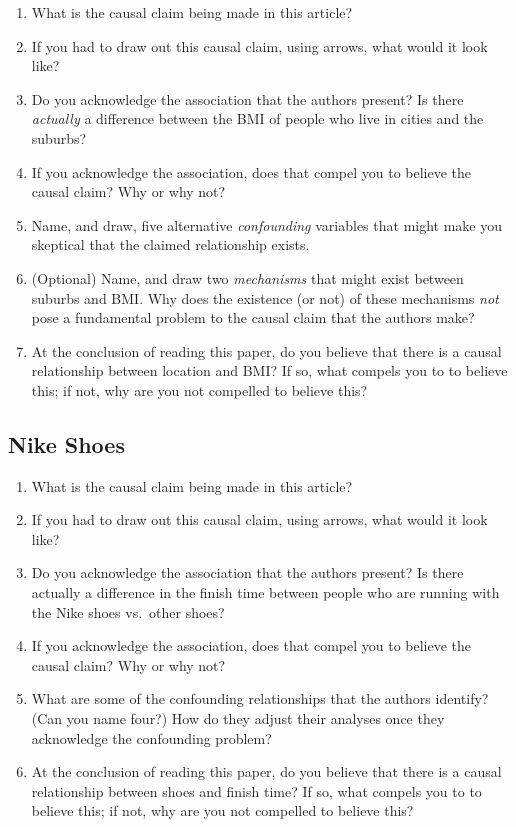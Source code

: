 \documentclass[
]{book}
\providecommand{\tightlist}{%
  \setlength{\itemsep}{0pt}\setlength{\parskip}{0pt}}
\begin{document}
\begin{enumerate}
\def\labelenumi{\arabic{enumi}.}
\tightlist
\item
  What is the causal claim being made in this article?
\item
  If you had to draw out this causal claim, using arrows, what would it
  look like?
\item
  Do you acknowledge the association that the authors present? Is there
  \emph{actually} a difference between the BMI of people who live in
  cities and the suburbs?
\item
  If you acknowledge the association, does that compel you to believe
  the causal claim? Why or why not?
\item
  Name, and draw, five alternative \emph{confounding} variables that
  might make you skeptical that the claimed relationship exists.
\item
  (Optional) Name, and draw two \emph{mechanisms} that might exist
  between suburbs and BMI. Why does the existence (or not) of these
  mechanisms \emph{not} pose a fundamental problem to the causal claim
  that the authors make?
\item
  At the conclusion of reading this paper, do you believe that there is
  a causal relationship between location and BMI? If so, what compels
  you to to believe this; if not, why are you not compelled to believe
  this?
\end{enumerate}

\hypertarget{nike-shoes}{%
\subsection{Nike Shoes}\label{nike-shoes}}

\begin{enumerate}
\def\labelenumi{\arabic{enumi}.}
\tightlist
\item
  What is the causal claim being made in this article?
\item
  If you had to draw out this causal claim, using arrows, what would it
  look like?
\item
  Do you acknowledge the association that the authors present? Is there
  actually a difference in the finish time between people who are
  running with the Nike shoes vs.~other shoes?
\item
  If you acknowledge the association, does that compel you to believe
  the causal claim? Why or why not?
\item
  What are some of the confounding relationships that the authors
  identify? (Can you name four?) How do they adjust their analyses once
  they acknowledge the confounding problem?
\item
  At the conclusion of reading this paper, do you believe that there is
  a causal relationship between shoes and finish time? If so, what
  compels you to to believe this; if not, why are you not compelled to
  believe this?
\end{enumerate}
\end{document}
